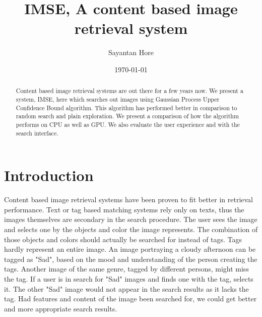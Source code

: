 \documentclass[english]{tktltiki}
\begin{document}
\onehalfspacing

\title{IMSE, A content based image retrieval system}
\author{Sayantan Hore}
\date{\today}

\maketitle



\begin{abstract}

Content based image retrieval systems are out there for a few years now. We present a system, IMSE, here which searches out images using Gaussian Process Upper Confidence Bound algorithm. This algorithm has performed better in comparison to random search and plain exploration. We present a comparison of how the algorithm performs on CPU as well as GPU. We also evaluate the user experience and with the search interface.

\end{abstract}

\mytableofcontents




\section{Introduction}


Content based image retrieval systems have been proven to fit better in retrieval performance. Text or tag based matching systems rely only on texts, thus the images themselves are secondary in the search procedure. The user sees the image and selects one by the objects and color the image represents. The combination of those objects and colors should actually be searched for instead of tags. Tags hardly represent an entire image. An image portraying a cloudy afternoon can be tagged as "Sad", based on the mood and understanding of the person creating the tags. Another image of the same genre, tagged by different persons, might miss the tag. If a user is in search for "Sad" images and finds one with the tag, selects it. The other "Sad" image would not appear in the search results as it lacks the tag. Had features and content of the image been searched for, we could get better and more appropriate search results.
\end{document}
